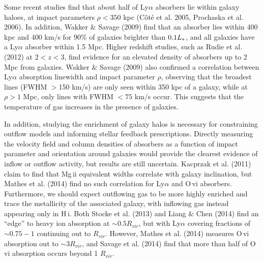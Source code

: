 \documentclass[iop]{emulateapj-rtx4}
\begin{document}


Some recent studies find that about half of Ly$\alpha$ absorbers lie within galaxy haloes, at impact parameters $\rho<350$ kpc (C\^{o}t\'{e} et al. 2005, Prochaska et al. 2006). In addition, Wakker $\&$ Savage (2009) find that an absorber lies within 400 kpc and 400 km/s for $90\%$ of galaxies brighter than $0.1L_{\**}$, and all galaxies have a Ly$\alpha$ absorber within 1.5 Mpc. Higher redshift studies, such as Rudie et al. (2012) at $2<z<3$, find evidence for an elevated density of absorbers up to 2 Mpc from galaxies. Wakker $\&$ Savage (2009) also confirmed a correlation between Ly$\alpha$ absorption linewidth and impact parameter $\rho$, observing that the broadest lines (FWHM $>$150 km/s) are only seen within 350 kpc of a galaxy, while at $\rho>1$ Mpc, only lines with FWHM $<75$ km/s occur. This suggests that the temperature of gas increases in the presence of galaxies.

In addition, studying the enrichment of galaxy halos is necessary for constraining outflow models and informing stellar feedback prescriptions. Directly measuring the velocity field and column densities of absorbers as a function of impact parameter and orientation around galaxies would provide the clearest evidence of inflow or outflow activity, but results are still uncertain. Kacprzak et al. (2011) claim to find that Mg\,{\sc ii} equivalent widths correlate with galaxy inclination, but Mathes et al. (2014) find no such correlation for Ly$\alpha$ and O\,{\sc vi} absorbers. Furthermore, we should expect outflowing gas to be more highly enriched and trace the metallicity of the associated galaxy, with inflowing gas instead appearing only in H\,{\sc i}. Both Stocke et al. (2013) and Liang $\&$ Chen (2014) find an ``edge'' to heavy ion absorption at $\sim0.5R_{vir}$, but with Ly$\alpha$ covering fractions of $\sim0.75-1$ continuing out to $R_{vir}$. However, Mathes et al. (2014) measures O\,{\sc vi} absorption out to $\sim3 R_{vir}$, and Savage et al. (2014) find that more than half of O\,{\sc vi} absorption occurs beyond 1 $R_{vir}$.
\end{document}
